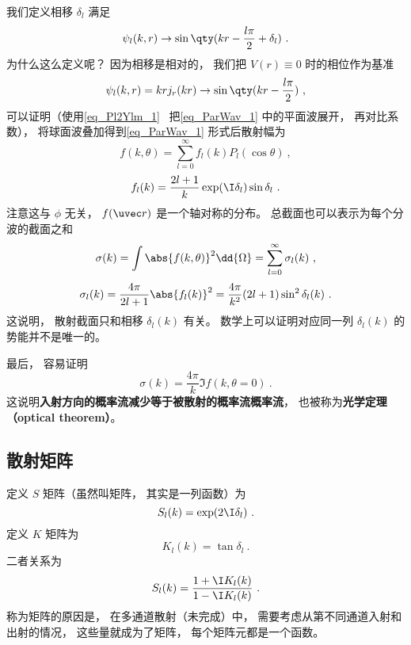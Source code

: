 我们定义相移 $\delta_l$ 满足
\begin{equation}
\psi_l(k, r) \to \sin\qty(kr - \frac{l\pi}{2} + \delta_l)~.
\end{equation}
为什么这么定义呢？ 因为相移是相对的， 我们把 $V(r) \equiv 0$ 时的相位作为基准
\begin{equation}
\psi_l(k, r) = kr j_r(kr) \to \sin\qty(kr - \frac{l\pi}{2})~,
\end{equation}
可以证明（使用\autoref{eq_Pl2Ylm_1}~ 把\autoref{eq_ParWav_1} 中的平面波展开， 再对比系数）， 将球面波叠加得到\autoref{eq_ParWav_1} 形式后散射幅为
\begin{equation}
f(k, \theta) = \sum_{l=0}^\infty f_l(k) P_l(\cos\theta)~,
\end{equation}
\begin{equation}
f_l(k) = \frac{2l+1}{k} \exp(\I\delta_l) \sin\delta_l~.
\end{equation}
注意这与 $\phi$ 无关， $f(\uvec r)$ 是一个轴对称的分布。 总截面也可以表示为每个分波的截面之和
\begin{equation}
\sigma(k) = \int \abs{f(k,\theta)}^2 \dd{\Omega} = \sum_{l=0}^\infty \sigma_l(k)~,
\end{equation}
\begin{equation}
\sigma_l(k) = \frac{4\pi}{2l+1} \abs{f_l(k)}^2 = \frac{4\pi}{k^2} (2l + 1) \sin^2 \delta_l(k)~.
\end{equation}
这说明， 散射截面只和相移 $\delta_l(k)$ 有关。 数学上可以证明对应同一列 $\delta_l(k)$ 的势能并不是唯一的。

最后， 容易证明
\begin{equation}
\sigma(k) = \frac{4\pi}{k} \Im f(k,\theta=0)~.
\end{equation}
这说明\textbf{入射方向的概率流减少等于被散射的概率流概率流}， 也被称为\textbf{光学定理（optical theorem）}。

\subsection{散射矩阵}
定义 $S$ 矩阵（虽然叫矩阵， 其实是一列函数）为
\begin{equation}
S_l(k) = \exp(2\I\delta_l)~.
\end{equation}
定义 $K$ 矩阵为
\begin{equation}
K_l(k) = \tan \delta_l~.
\end{equation}
二者关系为
\begin{equation}
S_l(k) = \frac{1 + \I K_l(k)}{1 - \I K_l(k)}~.
\end{equation}
称为矩阵的原因是， 在多通道散射（未完成）中， 需要考虑从第不同通道入射和出射的情况， 这些量就成为了矩阵， 每个矩阵元都是一个函数。

